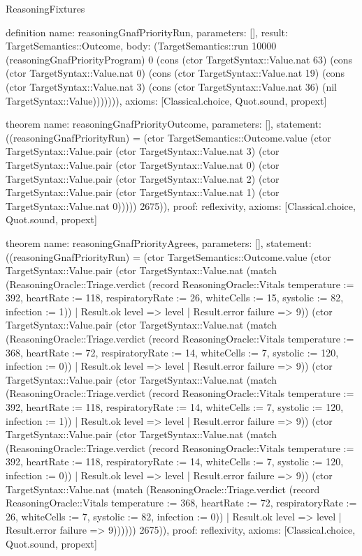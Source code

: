 \begin{lexlean}{ReasoningFixtures}
\begin{semanticmodule}
definition{
  name: reasoningGnafPriorityRun,
  parameters: [],
  result: TargetSemantics::Outcome,
  body: (TargetSemantics::run 10000 (reasoningGnafPriorityProgram) 0 (cons (ctor TargetSyntax::Value.nat 63) (cons (ctor TargetSyntax::Value.nat 0) (cons (ctor TargetSyntax::Value.nat 19) (cons (ctor TargetSyntax::Value.nat 3) (cons (ctor TargetSyntax::Value.nat 36) (nil TargetSyntax::Value))))))),
  axioms: [Classical.choice, Quot.sound, propext]
}

theorem{
  name: reasoningGnafPriorityOutcome,
  parameters: [],
  statement: ((reasoningGnafPriorityRun) = (ctor TargetSemantics::Outcome.value (ctor TargetSyntax::Value.pair (ctor TargetSyntax::Value.nat 3) (ctor TargetSyntax::Value.pair (ctor TargetSyntax::Value.nat 0) (ctor TargetSyntax::Value.pair (ctor TargetSyntax::Value.nat 2) (ctor TargetSyntax::Value.pair (ctor TargetSyntax::Value.nat 1) (ctor TargetSyntax::Value.nat 0))))) 2675)),
  proof: reflexivity{},
  axioms: [Classical.choice, Quot.sound, propext]
}

theorem{
  name: reasoningGnafPriorityAgrees,
  parameters: [],
  statement: ((reasoningGnafPriorityRun) = (ctor TargetSemantics::Outcome.value (ctor TargetSyntax::Value.pair (ctor TargetSyntax::Value.nat (match (ReasoningOracle::Triage.verdict (record ReasoningOracle::Vitals {temperature := 392, heartRate := 118, respiratoryRate := 26, whiteCells := 15, systolic := 82, infection := 1}))
    | Result.ok level => level
    | Result.error failure => 9)) (ctor TargetSyntax::Value.pair (ctor TargetSyntax::Value.nat (match (ReasoningOracle::Triage.verdict (record ReasoningOracle::Vitals {temperature := 368, heartRate := 72, respiratoryRate := 14, whiteCells := 7, systolic := 120, infection := 0}))
    | Result.ok level => level
    | Result.error failure => 9)) (ctor TargetSyntax::Value.pair (ctor TargetSyntax::Value.nat (match (ReasoningOracle::Triage.verdict (record ReasoningOracle::Vitals {temperature := 392, heartRate := 118, respiratoryRate := 14, whiteCells := 7, systolic := 120, infection := 1}))
    | Result.ok level => level
    | Result.error failure => 9)) (ctor TargetSyntax::Value.pair (ctor TargetSyntax::Value.nat (match (ReasoningOracle::Triage.verdict (record ReasoningOracle::Vitals {temperature := 392, heartRate := 118, respiratoryRate := 14, whiteCells := 7, systolic := 120, infection := 0}))
    | Result.ok level => level
    | Result.error failure => 9)) (ctor TargetSyntax::Value.nat (match (ReasoningOracle::Triage.verdict (record ReasoningOracle::Vitals {temperature := 368, heartRate := 72, respiratoryRate := 26, whiteCells := 7, systolic := 82, infection := 0}))
    | Result.ok level => level
    | Result.error failure => 9)))))) 2675)),
  proof: reflexivity{},
  axioms: [Classical.choice, Quot.sound, propext]
}


\end{semanticmodule}
\end{lexlean}
